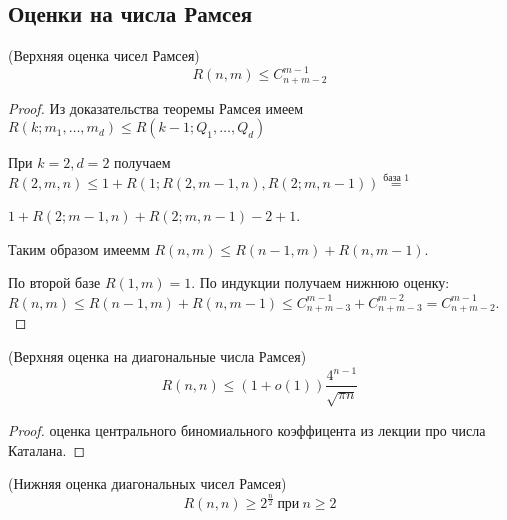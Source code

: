\subsection{Оценки на числа Рамсея}

\begin{theorem} (Верхняя оценка чисел Рамсея)
    \[ R(n, m) \leq C_{n + m - 2}^{m - 1} \]
\end{theorem}

\begin{proof}

    Из доказательства теоремы Рамсея имеем $R(k; m_1, \ldots, m_d) \leq R(k-1; Q_1, \ldots, Q_d)$
    
    При $k = 2, d = 2$ получаем $R(2, m, n) \leq 1 + R(1; R(2, m - 1, n), R(2; m, n - 1)) \overset{\text{база 1}}{=}$

    $1 + R(2; m - 1, n) + R(2; m, n - 1) - 2 + 1$.

    Таким образом имеемм $R(n, m) \leq R(n - 1, m) + R(n, m - 1)$.

    По второй базе $R(1, m) = 1$. По индукции получаем нижнюю оценку:\\
    $R(n, m) \leq R(n - 1, m) + R(n, m - 1) \leq C_{n + m - 3}^{m - 1} + C_{n + m - 3}^{m - 2} = C_{n + m - 2}^{m - 1}$.\\
\end{proof}

\begin{follow} (Верхняя оценка на диагональные числа Рамсея)
    \[ R(n, n) \leq (1 + o(1)) \frac{4^{n - 1}}{\sqrt{\pi n}} \]
\end{follow}

\begin{proof}
    оценка центрального биномиального коэффицента из лекции про числа Каталана.
\end{proof}

\begin{theorem} (Нижняя оценка диагональных чисел Рамсея)
    \[ R(n, n) \geq 2^{\frac{n}{2}}~\text{при}~n \geq 2 \]
\end{theorem}

